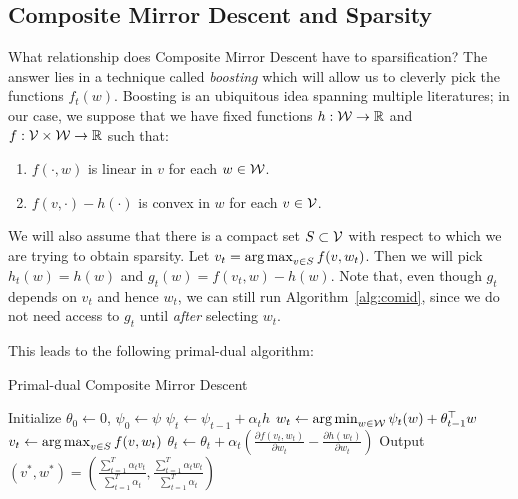 \documentclass[paper.tex]{subfiles}
\begin{document}
\subsection{Composite Mirror Descent and Sparsity}
\label{sec:boosted}
What relationship does Composite Mirror Descent have to sparsification? The answer lies
in a technique called \emph{boosting} which will allow us to cleverly pick the functions 
$f_t(w)$. Boosting is an ubiquitous idea spanning multiple literatures; %
in our case, we suppose that we have fixed functions $h : \mathcal{W} \to \mathbb{R}$ and 
$f : \mathcal{V} \times \mathcal{W} \to \mathbb{R}$ such that:
\begin{enumerate}
\item $f(\cdot, w)$ is linear in $v$ for each $w \in \mathcal{W}$.
\item $f(v, \cdot) - h(\cdot)$ is convex in $w$ for each $v \in \mathcal{V}$.
\end{enumerate}
We will also assume that there is a compact set $S \subset \mathcal{V}$ with respect 
to which we are trying to obtain sparsity. Let 
$v_t = \argmax_{v \in S} f(v, w_t)$. Then we will pick 
$h_t(w) = h(w)$ and $g_t(w) = f(v_t, w) - h(w)$. Note that, 
even though $g_t$ depends on $v_t$ and hence $w_t$, we can still 
run Algorithm~\ref{alg:comid}, since we do not need access to $g_t$ 
until \emph{after} selecting $w_t$. 

This leads to the following primal-dual algorithm:
\begin{algorithm}
\caption{Primal-dual Composite Mirror Descent}
\label{alg:boosted-comid}
\begin{algorithmic}
\STATE Initialize $\theta_0 \gets 0$, $\psi_0 \gets \psi$
  \STATE $\psi_t \gets \psi_{t-1} + \alpha_t h$
  \STATE $w_t \gets \argmin_{w \in \W} \psi_t(w) + \theta_{t-1}^{\top} w$
  \STATE $v_t \gets \argmax_{v \in S} f(v, w_t)$
  \STATE $\theta_t \gets \theta_t + \alpha_t \left(\frac{\partial f(v_t, w_t)}{\partial w_t} - \frac{\partial h(w_t)}{\partial w_t}\right)$
\ENDFOR
\STATE Output $(v^*, w^*) = \left(\frac{\sum_{t=1}^T \alpha_t v_t}{\sum_{t=1}^T \alpha_t}, \frac{\sum_{t=1}^T \alpha_t w_t}{\sum_{t=1}^T \alpha_t}\right)$
\end{algorithmic}
\end{algorithm}
\end{document}
